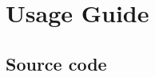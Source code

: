 \documentclass[11pt]{llncs}
\begin{document}

\newpage

\section{Usage Guide}

\subsection{Source code}
\end{document}
